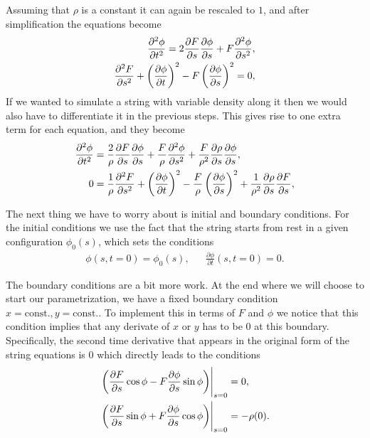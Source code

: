 \documentclass[10pt,a4paper,twocolumn]{article}
\begin{document}
Assuming that $\rho$ is a constant it can again be rescaled to $1$, and after simplification the equations become
%
\begin{align}
    \frac{\partial^2 \phi}{\partial t^2} = 2 \frac{\partial F}{\partial s} \frac{\partial \phi}{\partial s} + F \frac{\partial^2 \phi}{\partial s^2}, \notag\\
    \frac{\partial^2 F}{\partial s^2} + \left( \frac{\partial \phi}{\partial t} \right)^2 - F \left( \frac{\partial \phi}{\partial s} \right)^2 = 0,
\end{align}
%
If we wanted to simulate a string with variable density along it then we would also have to differentiate it in the previous steps. This gives rise to one extra term for each equation, and they become
%
\begin{align}
    \frac{\partial^2 \phi}{\partial t^2} &= \frac{2}{\rho} \frac{\partial F}{\partial s} \frac{\partial \phi}{\partial s} + \frac{F}{\rho} \frac{\partial^2 \phi}{\partial s^2} + \frac{F}{\rho^2} \frac{\partial \rho}{\partial s} \frac{\partial \phi}{\partial s},\\
    0 &= \frac{1}{\rho} \frac{\partial^2 F}{\partial s^2} + \left( \frac{\partial \phi}{\partial t} \right)^2 - \frac{F}{\rho} \left( \frac{\partial \phi}{\partial s} \right)^2 + \frac{1}{\rho^2} \frac{\partial \rho}{\partial s} \frac{\partial F}{\partial s},\notag
\end{align}

The next thing we have to worry about is initial and boundary conditions. For the initial conditions we use the fact that the string starts from rest in a given configuration $\phi_0(s)$, which sets the conditions
%
\begin{align}
    &\phi(s, t=0) = \phi_0(s),& &\frac{\partial \phi}{\partial t}(s, t=0) = 0.&
\end{align}

The boundary conditions are a bit more work. At the end where we will choose to start our parametrization, we have a fixed boundary condition $x=\mathrm{const.}, y=\mathrm{const.}$. To implement this in terms of $F$ and $\phi$ we notice that this condition implies that any derivate of $x$ or $y$ has to be $0$ at this boundary. Specifically, the second time derivative that appears in the original form of the string equations is $0$ which directly leads to the conditions
%
\begin{align}
    \left.\left(\frac{\partial F}{\partial s} \cos \phi - F \frac{\partial \phi}{\partial s} \sin \phi \right)\right|_{s=0} &= 0, \notag\\
    \left.\left(\frac{\partial F}{\partial s} \sin \phi + F \frac{\partial \phi}{\partial s} \cos \phi \right)\right|_{s=0} &= -\rho(0).
\end{align}
\end{document}
